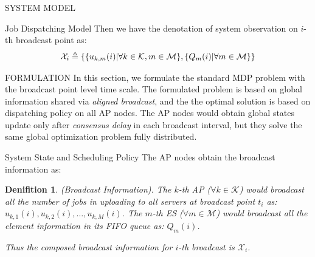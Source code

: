 \documentclass[10pt, conference, letterpaper]{IEEEtran}
\newtheorem{definition}{Denifition}
\newcommand{\define}{\triangleq}
\DeclarePairedDelimiter{\set}{\{}{\}}
\newcommand{\apSet}{\mathcal{K}}
\newcommand{\esSet}{\mathcal{M}}
\newcommand{\Obsv}{\mathcal{X}}
\begin{document}
\begin{section}{SYSTEM MODEL}
\begin{subsection}{Job Dispatching Model}
            Then we have the denotation of system observation on $i$-th broadcast point as:
            \begin{align}
                \Obsv_i \define \{ \set{u_{k,m}(i)|\forall k\in\apSet,m\in\esSet}, \set{Q_m(i)|\forall m\in\esSet} \}
            \end{align}
        \end{subsection}
    \end{section}

    \begin{section}{FORMULATION}
        \label{sec:formulation}
        In this section, we formulate the standard MDP problem with the broadcast point level time scale. The formulated problem is based on global information shared via \emph{aligned broadcast}, and the the optimal solution is based on dispatching policy on all AP nodes. The AP nodes would obtain global states update only after \emph{consensus delay} in each broadcast interval, but they solve the same global optimization problem fully distributed.

        \begin{subsection}{System State and Scheduling Policy}
            The AP nodes obtain the broadcast information as:
            \begin{definition}(Broadcast Information).
                The $k$-th AP ($\forall k\in\apSet$) would broadcast all the number of jobs in uploading to all servers at broadcast point $t_i$ as: $u_{k,1}(i), u_{k,2}(i), \dots, u_{k,M}(i)$.
                The $m$-th ES ($\forall m\in\esSet$) would broadcast all the element information in its FIFO queue as: $Q_m(i)$.

                Thus the composed broadcast information for $i$-th broadcast is $\Obsv_i$.
            \end{definition}


\end{subsection}
\end{section}
\end{document}
